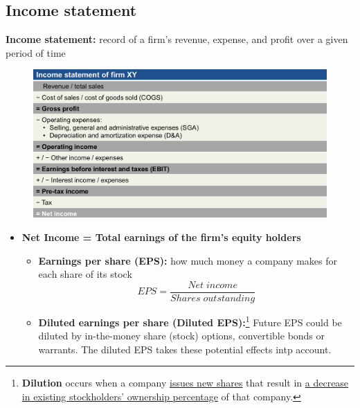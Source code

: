 \documentclass[ieeetran]{article}
\begin{document}
   







\subsection{Income statement} %
\label{sub:subsubName}
\textbf{Income statement:} record of a firm's revenue, expense, and profit over a given period of time

\pagebreak

\begin{figure}[t]
  \centering
  \includegraphics[width=1\linewidth]{incomestatement.jpg}
  \label{fig:income_statement_figure}
\end{figure}
\begin{itemize}
  \item \textbf{Net Income = Total earnings of the firm's equity holders}
	  \begin{itemize}
	    \item \textbf{Earnings per share (EPS):} how much money a company makes for each share of its stock
		   \large
		   \begin{equation*}
		   \boxed{EPS = \frac{Net \; income}{Shares \; outstanding}}
		   \end{equation*}
		   \normalsize

	   \item \textbf{Diluted earnings per share (Diluted EPS):}\footnote{\textbf{Dilution} occurs when a company \underline{issues new shares} that result in \underline{a decrease in existing stockholders' ownership percentage} of that company.} Future EPS could be diluted by in-the-money share (stock) options, convertible bonds or warrants. The diluted EPS takes these potential effects intp account.		   	

	  \end{itemize}

\end{itemize}
\end{document}
